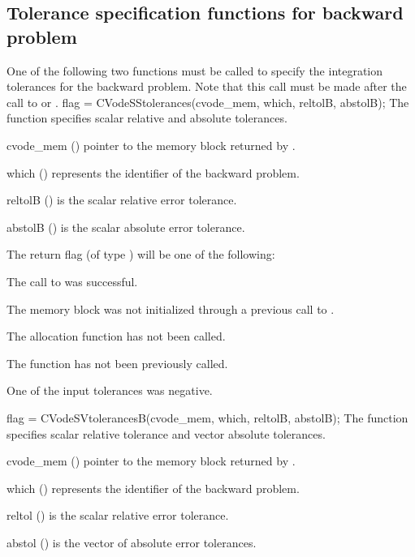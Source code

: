 \subsection{Tolerance specification functions for backward problem}
\label{sss:cvtolerances_b}
One of the following two functions must be called to specify the integration 
tolerances for the backward problem. Note that this call must be made after the 
call to  or .
{
  flag = CVodeSStolerances(cvode\_mem, which, reltolB, abstolB);
}
{
  The function  specifies scalar relative and absolute
  tolerances.
}
{
  \begin{args}
  \item[cvode\_mem] ()
    pointer to the {\cvodes} memory block returned by .
  \item[which] ()
    represents the identifier of the backward problem.
  \item[reltolB] ()
    is the scalar relative error tolerance.
  \item[abstolB] ()
    is the scalar absolute error tolerance.
  \end{args}
}
{
  The return flag  (of type ) will be one of the following:
  \begin{args}
  \item[\Id{CV\_SUCCESS}]
    The call to  was successful.
  \item[\Id{CV\_MEM\_NULL}] 
    The {\cvodes} memory block was not initialized through a previous call to
    .
  \item[\Id{CV\_NO\_MALLOC}] 
    The allocation function  has not been called.
  \item[\Id{CV\_NO\_ADJ}]
    The function  has not been previously called.
  \item[\Id{CV\_ILL\_INPUT}] 
    One of the input tolerances was negative.
  \end{args}
}
{}
{
  flag = CVodeSVtolerancesB(cvode\_mem, which, reltolB, abstolB);
}
{
  The function  specifies scalar relative tolerance and
  vector absolute tolerances.
}
{
  \begin{args}
  \item[cvode\_mem] ()
    pointer to the {\cvodes} memory block returned by .
  \item[which] ()
    represents the identifier of the backward problem.
  \item[reltol] ()
    is the scalar relative error tolerance.
  \item[abstol] ()
    is the vector of absolute error tolerances.
  \end{args}
}
